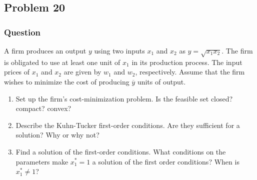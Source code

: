 \documentclass[12pt]{article}
\begin{document}
\subsection{Problem 20}
\subsubsection{Question}
A firm produces an output $y$ using two inputs $x_1$ and $x_2$ as $y = \sqrt{x_1 x_2}$. The firm is obligated to use at least one unit of $x_1$ in its production process. The input prices of $x_1$ and $x_2$ are given by $w_1$ and $w_2$, respectively. Assume that the firm wishes to minimize the cost of producing $\overline{y}$ units of output.
\begin{enumerate}
\item Set up the firm's cost-minimization problem. Is the feasible set closed? compact? convex?
\item Describe the Kuhn-Tucker first-order conditions. Are they sufficient for a solution? Why or why not?
\item Find a solution of the first-order conditions. What conditions on the parameters make $x_1^*=1$  a solution of the first order conditions? When is $x_1^* \neq 1$?
\end{enumerate}
\end{document}
